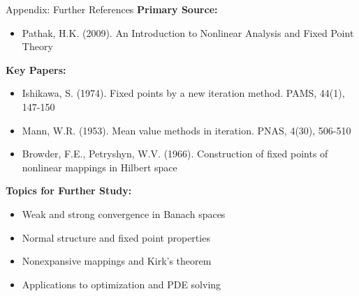 \documentclass[aspectratio=169,10pt]{beamer}
\begin{document}
\begin{frame}{Appendix: Further References}
\textbf{Primary Source:}
\begin{itemize}
    \item Pathak, H.K. (2009). An Introduction to Nonlinear Analysis and Fixed Point Theory
\end{itemize}

\vspace{0.2cm}

\textbf{Key Papers:}
\begin{itemize}
    \item Ishikawa, S. (1974). Fixed points by a new iteration method. PAMS, 44(1), 147-150
    \item Mann, W.R. (1953). Mean value methods in iteration. PNAS, 4(30), 506-510
    \item Browder, F.E., Petryshyn, W.V. (1966). Construction of fixed points of nonlinear mappings in Hilbert space
\end{itemize}

\vspace{0.2cm}

\textbf{Topics for Further Study:}
\begin{itemize}
    \item Weak and strong convergence in Banach spaces
    \item Normal structure and fixed point properties
    \item Nonexpansive mappings and Kirk's theorem
    \item Applications to optimization and PDE solving
\end{itemize}
\end{frame}
\end{document}
